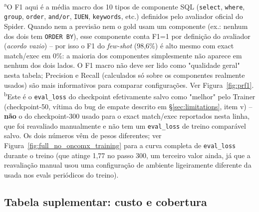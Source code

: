 \begin{table}[h]
\vspace{0.4em}
{\footnotesize
\textsuperscript{a}O F1 aqui é a média macro dos 10 tipos de componente
SQL (\texttt{select}, \texttt{where}, \texttt{group}, \texttt{order},
\texttt{and/or}, \texttt{IUEN}, \texttt{keywords}, etc.) definidos pelo
avaliador oficial do Spider. Quando nem a previsão nem o gold usam um
componente (ex.: nenhum dos dois tem \texttt{ORDER BY}), esse componente
conta F1=1 por definição do avaliador (\emph{acordo vazio}) -- por isso o
F1 do \emph{few-shot} (98,6\%) é alto mesmo com exact match/exec em 0\%: a
maioria dos componentes simplesmente não aparece em nenhum dos dois lados.
O F1 macro não deve ser lido como "qualidade geral" nesta tabela; Precision
e Recall (calculados só sobre os componentes realmente usados) são mais
informativos para comparar configurações. Ver Figura~\ref{fig:prf1}.\\
\textsuperscript{b}Este é o \texttt{eval\_loss} do checkpoint efetivamente
salvo como "melhor" pelo Trainer (checkpoint-50, vítima do bug de empate
descrito em \S\ref{sec:limitations}, item v) -- \textbf{não} o do
checkpoint-300 usado para o exact match/exec reportados nesta linha, que
foi reavaliado manualmente e não tem um \texttt{eval\_loss} de treino
comparável salvo. Os dois números vêm de pesos diferentes; ver
Figura~\ref{fig:full_no_oncomx_training} para a curva completa de
\texttt{eval\_loss} durante o treino (que atinge 1,77 no passo 300, um
terceiro valor ainda, já que a reavaliação manual usou uma configuração de
ambiente ligeiramente diferente da usada nos evals periódicos do treino).}
\end{table}

\subsection{Tabela suplementar: custo e cobertura}

